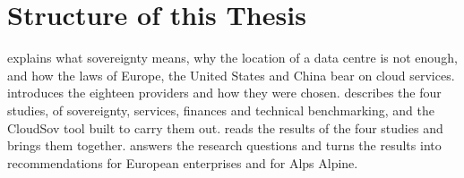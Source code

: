 \section{Structure of this Thesis}
\label{sec:structure}

 explains what sovereignty means, why the location of a data
centre is not enough, and how the laws of Europe, the United States and China bear on
cloud services.  introduces the eighteen providers and how they were
chosen.  describes the four studies, of sovereignty, services,
finances and technical benchmarking, and the CloudSov tool built to carry them out.
 reads the results of the four studies and brings them together.
 answers the research questions and turns the results into
recommendations for European enterprises and for Alps Alpine.
